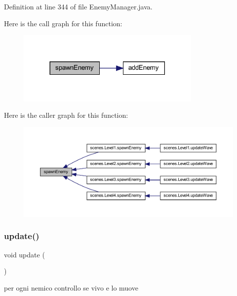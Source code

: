 Definition at line 344 of file Enemy\+Manager.\+java.

Here is the call graph for this function\+:
\nopagebreak
\begin{figure}[H]
\begin{center}
\leavevmode
\includegraphics[width=254pt]{classmanagers_1_1_enemy_manager_a3714d243133c700dca12625cccf518aa_cgraph}
\end{center}
\end{figure}
Here is the caller graph for this function\+:\nopagebreak
\begin{figure}[H]
\begin{center}
\leavevmode
\includegraphics[width=350pt]{classmanagers_1_1_enemy_manager_a3714d243133c700dca12625cccf518aa_icgraph}
\end{center}
\end{figure}
\mbox{\label{classmanagers_1_1_enemy_manager_ac5c54df7ed3b930268c8d7752c101725}} 
\subsubsection{\texorpdfstring{update()}{update()}}
{\footnotesize\ttfamily void update (\begin{DoxyParamCaption}{ }\end{DoxyParamCaption})}



per ogni nemico controllo se vivo e lo muove 



